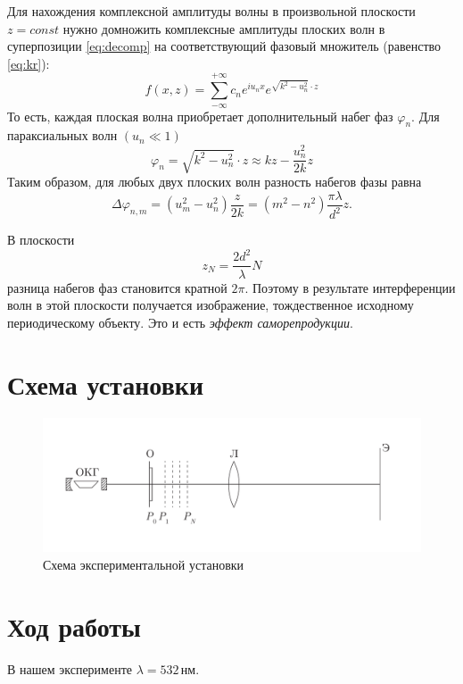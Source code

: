 \documentclass[a4paper, 12pt]{article}
\begin{document}
	Для нахождения комплексной амплитуды волны в произвольной плоскости $z = const$ нужно домножить комплексные амплитуды плоских волн в суперпозиции \eqref{eq:decomp} на соответствующий фазовый множитель (равенство \eqref{eq:kr}):
	\begin{equation}\label{eq:to_zz}
		f(x, z) = \sum\limits_{-\infty}^{+\infty} c_ne^{iu_nx}e^{\sqrt{k^2 - u_n^2}\cdot z}
	\end{equation}
	То есть, каждая плоская волна приобретает дополнительный набег фаз $\varphi_n$. Для параксиальных волн $(u_n \ll 1)$
	\begin{equation}\label{eq:parax}
		\varphi_n = \sqrt{k^2 - u_n^2}\cdot z \approx kz - \frac{u_n^2}{2k}z
	\end{equation}
	Таким образом, для любых двух плоских волн разность набегов фазы равна
	\begin{equation}\label{eq:phase}
		\Delta\varphi_{n, m} = (u_m^2 - u_n^2)\frac{z}{2k} = (m^2 - n^2)\frac{\pi\lambda}{d^2}z.
	\end{equation}
	
	В плоскости
	\begin{equation}
		z_N = \frac{2d^2}{\lambda}N
		\label{eq:8}
	\end{equation}
	разница набегов фаз становится кратной $2\pi$. Поэтому в результате интерференции волн в этой плоскости получается изображение, тождественное исходному периодическому объекту. Это и есть \textit{эффект саморепродукции}.
	\section{Схема установки}
	\begin{figure}[h]
		\centering
		\includegraphics[scale=0.6]{scheme.pdf}
		\caption{Схема экспериментальной установки}
	\end{figure}
	\section{Ход работы}
	В нашем эксперименте $\lambda = 532\,\text{нм}$.
\end{document}
